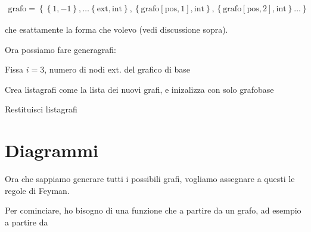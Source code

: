 \documentclass{report}
\begin{document}
\begin{align}
    \text{grafo} = \left\{\left\{1, -1 \right\}, \ldots \left\{\text{ext}, \text{int}\right\}, \left\{\text{grafo}[\text{pos}, 1], \text{int}\right\}, \left\{\text{grafo}[\text{pos}, 2], \text{int}\right\} \ldots\right\}
\end{align}

che esattamente la forma che volevo (vedi discussione sopra). 

Ora possiamo fare generagrafi: 

\begin{algorithm}[H]
\SetAlgoLined
{}
\BlankLine
Fissa \(i=3\), numero di nodi ext. del grafico di base\;

Crea listagrafi come la lista dei nuovi grafi, e inizalizza con solo grafobase\; 


Restituisci listagrafi\; 
\caption{generagrafi}
\end{algorithm}

\chapter{Diagrammi}

Ora che sappiamo generare tutti i possibili grafi, vogliamo assegnare a questi le regole di Feyman. 

Per cominciare, ho bisogno di una funzione che a partire da un grafo, ad esempio a partire da 

\begin{center}
\end{center}
\end{document}
